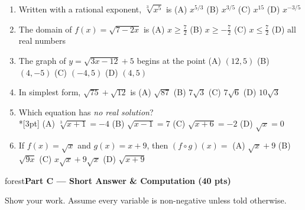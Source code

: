 \documentclass[10pt]{article}
\newcommand{\parthead}[1]{%
  \vspace{6pt}\noindent
  \begin{headlinebox}{forest}\color{white}\bfseries #1\end{headlinebox}%
  \vspace{4pt}}
\begin{document}
\begin{enumerate}[leftmargin=1.9em, itemsep=9pt]
  \item Written with a rational exponent, $\sqrt[3]{x^5}$ is\rlap{\hspace{4pt}\choicebox{\gradedblank[id=q9, type=choice, points=2, answer={A}]{0.3in}{10pt}}}
    \hfill (A) $x^{5/3}$ \quad (B) $x^{3/5}$ \quad (C) $x^{15}$ \quad (D) $x^{-3/5}$
  \item The domain of $f(x)=\sqrt{7-2x}$ is\rlap{\hspace{4pt}\choicebox{\gradedblank[id=q10, type=choice, points=2, answer={C}]{0.3in}{10pt}}}
    \hfill (A) $x\ge \frac72$ \quad (B) $x\ge -\frac72$ \quad (C) $x\le \frac72$ \quad (D) all real numbers
  \item The graph of $y=\sqrt{3x-12}+5$ begins at the point\rlap{\hspace{4pt}\choicebox{\gradedblank[id=q11, type=choice, points=2, answer={D}]{0.3in}{10pt}}}
    \hfill (A) $(12,5)$ \quad (B) $(4,-5)$ \quad (C) $(-4,5)$ \quad (D) $(4,5)$
  \item In simplest form, $\sqrt{75}+\sqrt{12}$ is\rlap{\hspace{4pt}\choicebox{\gradedblank[id=q12, type=choice, points=2, answer={B}]{0.3in}{10pt}}}
    \hfill (A) $\sqrt{87}$ \quad (B) $7\sqrt3$ \quad (C) $7\sqrt6$ \quad (D) $10\sqrt3$
  \item {}Which equation has \emph{no real solution}?
    \\*[3pt]\hspace*{1.2em} (A) $\sqrt[3]{x+1}=-4$
    \hspace{1.0cm} (B) $\sqrt{x-1}=7$
    \hspace{1.0cm} (C) $\sqrt{x+6}=-2$
    \hspace{1.0cm} (D) $\sqrt{x}=0$
  \item If $f(x)=\sqrt{x}$ and $g(x)=x+9$, then $(f\circ g)(x)=$\rlap{\hspace{3pt}\choicebox{\gradedblank[id=q14, type=choice, points=2, answer={D}]{0.26in}{10pt}}}
    \hfill (A) $\sqrt{x}+9$ \quad (B) $\sqrt{9x}$ \quad (C) $x\sqrt{x}+9\sqrt{x}$ \quad (D) $\sqrt{x+9}$
\end{enumerate}

\parthead{Part C --- Short Answer \& Computation (40 pts)}
Show your work. Assume every variable is non-negative unless told otherwise.
\end{document}
